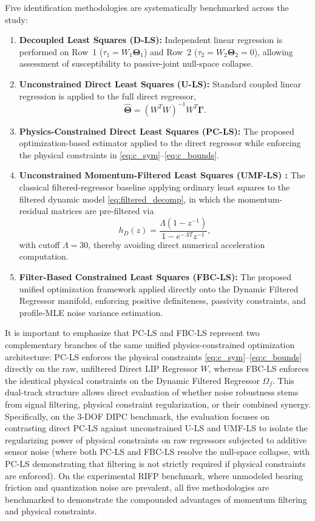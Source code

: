 \documentclass[lettersize,journal]{IEEEtran}
\begin{document}
Five identification methodologies are systematically benchmarked across the study:
\begin{enumerate}
	\item \textbf{Decoupled Least Squares (D-LS):} Independent linear regression is performed on Row~1 ($\tau_1 = W_1 \bm{\Theta}_1$) and Row~2 ($\tau_2 = W_2 \bm{\Theta}_2 = 0$), allowing assessment of susceptibility to passive-joint null-space collapse.
	
	\item \textbf{Unconstrained Direct Least Squares (U-LS):} Standard coupled linear regression is applied to the full direct regressor,
	\[\hat{\bm{\Theta}} = (W^T W)^{-1} W^T \bm{\Gamma}.\]
	
	\item \textbf{Physics-Constrained Direct Least Squares (PC-LS):} The proposed optimization-based estimator applied to the direct regressor while enforcing the physical constraints in \eqref{eq:c_sym}--\eqref{eq:c_bounds}.
	
	\item \textbf{Unconstrained Momentum-Filtered Least Squares (UMF-LS) \cite{GarciaAlarcon2012, AguilarSierra2014}:} The classical filtered-regressor baseline applying ordinary least squares to the filtered dynamic model \eqref{eq:filtered_decomp}, in which the momentum-residual matrices are pre-filtered via
	\[ 	h_D(z) = \frac{\Lambda(1-z^{-1})}{1-e^{-\Lambda T}z^{-1}},\]
	with cutoff $\Lambda = 30$, thereby avoiding direct numerical acceleration computation.
	
	\item \textbf{Filter-Based Constrained Least Squares (FBC-LS):} The proposed unified optimization framework applied directly onto the Dynamic Filtered Regressor manifold, enforcing positive definiteness, passivity constraints, and profile-MLE noise variance estimation.
\end{enumerate}
It is important to emphasize that PC-LS and FBC-LS represent two complementary branches of the same unified physics-constrained optimization architecture: PC-LS enforces the physical constraints \eqref{eq:c_sym}--\eqref{eq:c_bounds} directly on the raw, unfiltered Direct LIP Regressor $W$, whereas FBC-LS enforces the identical physical constraints on the Dynamic Filtered Regressor $\Omega_f$. This dual-track structure allows direct evaluation of whether noise robustness stems from signal filtering, physical constraint regularization, or their combined synergy. Specifically, on the 3-DOF DIPC benchmark, the evaluation focuses on contrasting direct PC-LS against unconstrained U-LS and UMF-LS to isolate the regularizing power of physical constraints on raw regressors subjected to additive sensor noise (where both PC-LS and FBC-LS resolve the null-space collapse, with PC-LS demonstrating that filtering is not strictly required if physical constraints are enforced). On the experimental RIFP benchmark, where unmodeled bearing friction and quantization noise are prevalent, all five methodologies are benchmarked to demonstrate the compounded advantages of momentum filtering and physical constraints.
\end{document}
